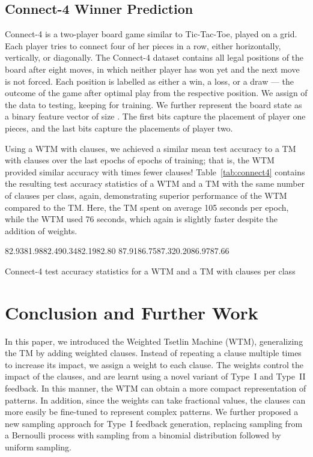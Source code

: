 \documentclass[letterpaper]{article}
\begin{document}
\subsection{Connect-4 Winner Prediction}
\label{section:connect-4}
Connect-4 is a two-player board game similar to Tic-Tac-Toe, played on a  grid. Each player tries to connect four of her pieces in a row, either horizontally, vertically, or diagonally. The Connect-4 dataset \cite{Dua:2019} contains all  legal positions of the board after eight moves, in which neither player has won yet and the next move is not forced. Each position is labelled as either a win, a loss, or a draw --- the outcome of the game after optimal play from the respective position. We assign  of the data to testing, keeping  for training. We further represent the board state as a binary feature vector of size . The first  bits capture the placement of player one pieces, and the last  bits capture the placements of player two.

Using a WTM with  clauses, we achieved a similar mean test accuracy to a TM with  clauses over the last  epochs of  epochs of training; that is, 
the WTM provided similar accuracy with  times fewer clauses! Table~\ref{tab:connect4} contains the resulting test accuracy statistics of a WTM and a TM with the same number of  clauses per class, again, demonstrating superior performance of the WTM compared to the TM. Here, the TM spent on average 105 seconds per epoch, while the WTM used 76 seconds, which again is slightly faster despite the addition of weights.



\begin{table}[!ht]
\centering
\tableit
{82.93}{81.98}{82.49}{0.34}{82.19}{82.80}
{87.91}{86.75}{87.32}{0.20}{86.97}{87.66}
\caption{Connect-4 test accuracy statistics for a WTM and a TM with  clauses per class
}
\label{tab:connect4}
\end{table}





\section{Conclusion and Further Work}\label{sec:conclusion}
In this paper, we introduced the Weighted Tsetlin Machine (WTM), generalizing the TM by adding weighted clauses. Instead of repeating a clause multiple times to increase its impact, we assign a weight to each clause. The weights control the impact of the clauses, and are learnt using a novel variant of Type~I and Type~II feedback. In this manner, the WTM can obtain a more compact representation of patterns. In addition, since the weights can take fractional values, the clauses can more easily be fine-tuned to represent complex patterns. We further proposed a new sampling approach for Type~I feedback generation, replacing sampling from a Bernoulli process with sampling from a binomial distribution followed by uniform sampling.
\end{document}
